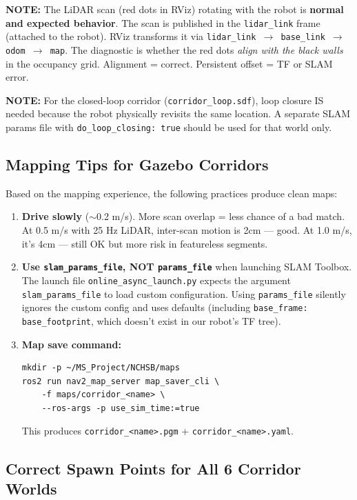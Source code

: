 \documentclass[11pt]{article}
\newcommand{\note}[1]{\textcolor{notblue}{\textbf{NOTE:} #1}}
\begin{document}
\note{The LiDAR scan (red dots in RViz) rotating with the robot is
\textbf{normal and expected behavior}. The scan is published in the
\texttt{lidar\_link} frame (attached to the robot). RViz transforms it via
\texttt{lidar\_link $\to$ base\_link $\to$ odom $\to$ map}. The diagnostic is
whether the red dots \emph{align with the black walls} in the occupancy grid.
Alignment = correct. Persistent offset = TF or SLAM error.}

\note{For the closed-loop corridor (\texttt{corridor\_loop.sdf}), loop closure
IS needed because the robot physically revisits the same location. A separate
SLAM params file with \texttt{do\_loop\_closing: true} should be used for that
world only.}

\subsection*{Mapping Tips for Gazebo Corridors}

Based on the mapping experience, the following practices produce clean maps:
\begin{enumerate}
  \item \textbf{Drive slowly} ($\sim$0.2 m/s). More scan overlap = less chance of
    a bad match. At 0.5 m/s with 25 Hz LiDAR, inter-scan motion is 2cm --- good.
    At 1.0 m/s, it's 4cm --- still OK but more risk in featureless segments.
  \item \textbf{Use \texttt{slam\_params\_file}, NOT \texttt{params\_file}} when
    launching SLAM Toolbox. The launch file \texttt{online\_async\_launch.py}
    expects the argument \texttt{slam\_params\_file} to load custom configuration.
    Using \texttt{params\_file} silently ignores the custom config and uses
    defaults (including \texttt{base\_frame: base\_footprint}, which doesn't exist
    in our robot's TF tree).
  \item \textbf{Map save command:}
\begin{lstlisting}
mkdir -p ~/MS_Project/NCHSB/maps
ros2 run nav2_map_server map_saver_cli \
    -f maps/corridor_<name> \
    --ros-args -p use_sim_time:=true
\end{lstlisting}
    This produces \texttt{corridor\_<name>.pgm} + \texttt{corridor\_<name>.yaml}.
\end{enumerate}

\subsection*{Correct Spawn Points for All 6 Corridor Worlds}
\end{document}
